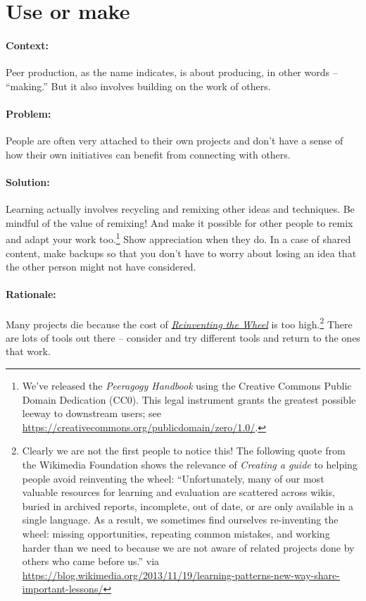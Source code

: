 \section{Use or make}
\paragraph{Context:}
Peer production, as the name indicates, is about producing, in other words --
``making.'' But it also involves building on the work of others.

\paragraph{Problem:}
People are often very attached to their own projects and don't have a sense of how their own initiatives can benefit from connecting with others.

\paragraph{Solution:} Learning actually involves recycling and remixing other ideas and techniques. Be mindful of the value of remixing!  And make it possible for other people to remix and adapt your work too.\footnote{We've released the \emph{Peeragogy Handbook} using the Creative Commons Public Domain Dedication (CC0).  This legal instrument grants the greatest possible leeway to downstream users; see \url{https://creativecommons.org/publicdomain/zero/1.0/}.}  Show appreciation when they do.  In a case of shared content, make backups so that you don't have to worry about losing an idea that the other person might not have considered.

\paragraph{Rationale:} 
Many projects die because the cost of \emph{\href{http://c2.com/cgi/wiki?ReinventingTheWheel}{Reinventing the Wheel}} is too high.\footnote{Clearly we are not the first people to notice this! The following quote from the Wikimedia Foundation shows the relevance of \emph{Creating a guide} to helping people avoid reinventing the wheel: ``Unfortunately, many of our most valuable resources for learning and evaluation are scattered across wikis, buried in archived reports, incomplete, out of date, or are only available in a single language. As a result, we sometimes find ourselves re-inventing the wheel: missing opportunities, repeating common mistakes, and working harder than we need to because we are not aware of related projects done by others who came before us.'' via \url{https://blog.wikimedia.org/2013/11/19/learning-patterns-new-way-share-important-lessons/}}  There are lots of tools out there -- consider and try different tools and return to the ones that work.

